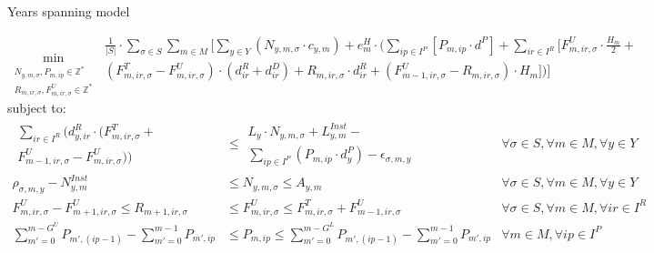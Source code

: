 \documentclass{beamer}
\newcommand{\smalld}{\tiny}
\begin{document}
\begin{frame}{Years spanning model}
\smalld

\begin{equation}
	\min_{\substack{N_{y,m,\sigma}, P_{m,ip} \in \mathbb{Z}^* \\ 
	R_{m,ir,\sigma}, F^U_{m,ir,\sigma} \in \mathbb{Z}^* }}
	\begin{aligned}
	\frac{1}{|S|} \cdot \sum_{\sigma \in S} \sum_{m \in M} [ \sum_{y \in Y} 
	(N_{y,m,\sigma} \cdot c_{y,m}) +  
	e^H_m \cdot (\sum_{ip \in I^P} [P_{m,ip} \cdot d^P] + 
	\sum_{ir \in I^R}[F^U_{m,ir,\sigma} \cdot \frac{H_m}{2} + \\
	(F^T_{m,ir,\sigma} - F^U_{m,ir,\sigma}) \cdot (d^R_{ir} + d^D_{ir}) + 
	R_{m,ir,\sigma}  \cdot d^R_{ir} + 
	(F^U_{m-1, ir, \sigma} - R_{m, ir, \sigma}) \cdot H_m])]
	\end{aligned}	
\end{equation}
subject to:
\begin{align}
\begin{aligned} \sum_{ir\in I^R} (d^R_{y, ir} \cdot (F^T_{m,ir,\sigma} + \\ F^U_{m-1,ir,\sigma} - F^U_{m,ir,\sigma})) \end{aligned}	
						&\leq		\begin{aligned} L_y \cdot N_{y,m,\sigma} + L^{Inst}_{y,m} - \\ \sum_{ip \in I^P} (P_{m,ip} \cdot d^P_y) - \epsilon_{\sigma, m, y} \end{aligned}																		& \forall \sigma \in S, \forall m \in M, \forall y \in Y	\\
\rho_{ \sigma, m, y} - N^{Inst}_{y,m}	&\leq		 N_{y,m,\sigma}	\leq 	A_{y,m} 							& \forall \sigma \in S, \forall m \in M, \forall y \in Y 	\\
F^U_{m, ir, \sigma} - F^U_{m+1, ir, \sigma}	\leq	 R_{m+1,ir,\sigma}				&\leq		F^U_{m,ir,\sigma}	\leq	F^T_{m, ir, \sigma} + 	F^U_{m-1, ir, \sigma}					& \forall \sigma \in S, \forall m \in M, \forall ir \in I^R	\\
\sum_{m' = 0}^{m-G^U} P_{m',(ip-1)} - \sum_{m' = 0}^{m-1} P_{m',ip} 	&\leq P_{m,ip}	\leq 	\sum_{m' = 0}^{m-G^L} P_{m',(ip-1)} - \sum_{m' = 0}^{m-1} P_{m',ip}	
																				& \forall m \in M, \forall ip \in I^P			
\end{align}

\end{frame}
\end{document}
